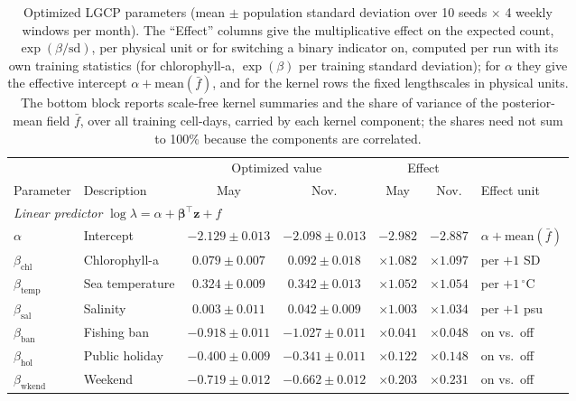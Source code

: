\begin{table}[t]
\centering
\caption{Optimized LGCP parameters (mean $\pm$ population standard deviation over 10 seeds $\times$ 4 weekly windows per month). The ``Effect'' columns give the multiplicative effect on the expected count, $\exp(\beta/\mathrm{sd})$, per physical unit or for switching a binary indicator on, computed per run with its own training statistics (for chlorophyll-a, $\exp(\beta)$ per training standard deviation); for $\alpha$ they give the effective intercept $\alpha+\mathrm{mean}(\bar f)$, and for the kernel rows the fixed lengthscales in physical units. The bottom block reports scale-free kernel summaries and the share of variance of the posterior-mean field $\bar f$, over all training cell-days, carried by each kernel component; the shares need not sum to 100\% because the components are correlated.}
\label{tab:lgcp_params}
\vspace{2pt}
\footnotesize
\setlength{\tabcolsep}{3.3pt}
\begin{tabular}{llccccl}
\toprule
 & & \multicolumn{2}{c}{Optimized value} & \multicolumn{2}{c}{Effect} & \\
\cmidrule(lr){3-4}\cmidrule(lr){5-6}
Parameter & Description & May & Nov. & May & Nov. & Effect unit \\
\midrule
\multicolumn{7}{l}{\textit{Linear predictor} $\log\lambda=\alpha+\boldsymbol{\beta}^\top\mathbf{z}+f$} \\
$\alpha$ & Intercept & $-2.129 \pm 0.013$ & $-2.098 \pm 0.013$ & $-2.982$ & $-2.887$ & $\alpha+\mathrm{mean}(\bar f)$ \\
$\beta_{\mathrm{chl}}$ & Chlorophyll-a & $0.079 \pm 0.007$ & $0.092 \pm 0.018$ & $\times1.082$ & $\times1.097$ & per $+1$ SD \\
$\beta_{\mathrm{temp}}$ & Sea temperature & $0.324 \pm 0.009$ & $0.342 \pm 0.013$ & $\times1.052$ & $\times1.054$ & per $+1\,^\circ$C \\
$\beta_{\mathrm{sal}}$ & Salinity & $0.003 \pm 0.011$ & $0.042 \pm 0.009$ & $\times1.003$ & $\times1.034$ & per $+1$ psu \\
$\beta_{\mathrm{ban}}$ & Fishing ban & $-0.918 \pm 0.011$ & $-1.027 \pm 0.011$ & $\times0.041$ & $\times0.048$ & on vs.\ off \\
$\beta_{\mathrm{hol}}$ & Public holiday & $-0.400 \pm 0.009$ & $-0.341 \pm 0.011$ & $\times0.122$ & $\times0.148$ & on vs.\ off \\
$\beta_{\mathrm{wkend}}$ & Weekend & $-0.719 \pm 0.012$ & $-0.662 \pm 0.012$ & $\times0.203$ & $\times0.231$ & on vs.\ off \\

\end{tabular}
\end{table}
